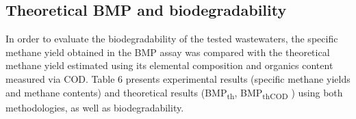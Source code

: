 \subsection{Theoretical BMP and biodegradability}
In order to evaluate the biodegradability of the tested wastewaters, the specific methane yield obtained in the BMP assay was compared with the theoretical methane yield estimated using its elemental composition and organics content measured via COD. Table 6 presents experimental results (specific methane yields and methane contents) and theoretical results (BMP\textsubscript{th}, BMP\textsubscript{thCOD} ) using both methodologies, as well as biodegradability.
